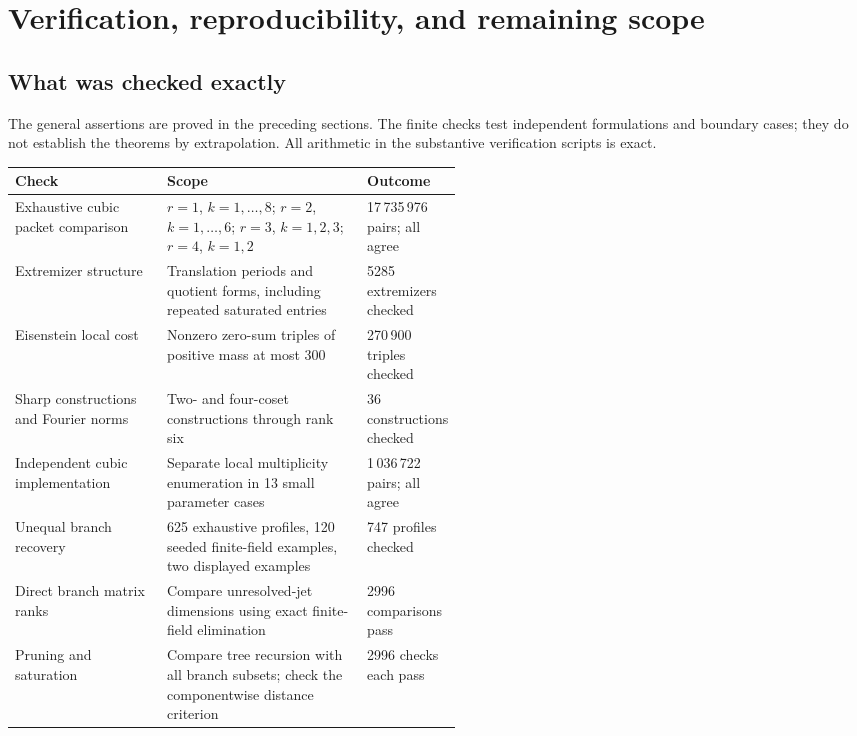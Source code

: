 \section{Verification, reproducibility, and remaining scope}
\label{sec:verification}

\subsection{What was checked exactly}

The general assertions are proved in the preceding sections. The finite
checks test independent formulations and boundary cases; they do not
establish the theorems by extrapolation. All arithmetic in the substantive
verification scripts is exact.

\begin{center}
\small
\begin{tabularx}{\linewidth}{@{}L{0.34\linewidth}YL{0.18\linewidth}@{}}
\toprule
Check & Scope & Outcome\\
\midrule
Exhaustive cubic packet comparison &
$r=1$, $k=1,\ldots,8$; $r=2$, $k=1,\ldots,6$;
$r=3$, $k=1,2,3$; $r=4$, $k=1,2$ &
17\,735\,976 pairs; all agree\\[3pt]
Extremizer structure & Translation periods and quotient forms, including
repeated saturated entries & 5285 extremizers checked\\[3pt]
Eisenstein local cost & Nonzero zero-sum triples of positive mass at most
300 & 270\,900 triples checked\\[3pt]
Sharp constructions and Fourier norms & Two- and four-coset constructions
through rank six & 36 constructions checked\\[3pt]
Independent cubic implementation & Separate local multiplicity enumeration
in 13 small parameter cases & 1\,036\,722 pairs; all agree\\[3pt]
Unequal branch recovery & 625 exhaustive profiles, 120 seeded finite-field
examples, two displayed examples & 747 profiles checked\\[3pt]
Direct branch matrix ranks & Compare unresolved-jet dimensions using exact
finite-field elimination & 2996 comparisons pass\\[3pt]
Pruning and saturation & Compare tree recursion with all branch subsets;
check the componentwise distance criterion & 2996 checks each pass\\
\bottomrule
\end{tabularx}
\end{center}

